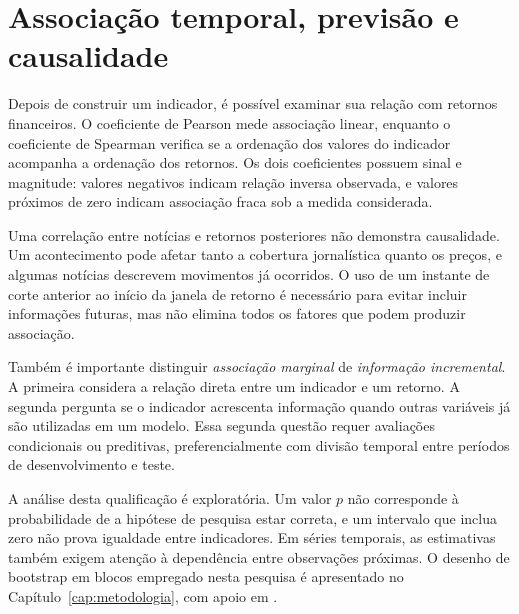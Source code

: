 \section{Associação temporal, previsão e causalidade}

Depois de construir um indicador, é possível examinar sua relação com retornos financeiros. O coeficiente de Pearson mede associação linear, enquanto o coeficiente de Spearman verifica se a ordenação dos valores do indicador acompanha a ordenação dos retornos. Os dois coeficientes possuem sinal e magnitude: valores negativos indicam relação inversa observada, e valores próximos de zero indicam associação fraca sob a medida considerada.

Uma correlação entre notícias e retornos posteriores não demonstra causalidade. Um acontecimento pode afetar tanto a cobertura jornalística quanto os preços, e algumas notícias descrevem movimentos já ocorridos. O uso de um instante de corte anterior ao início da janela de retorno é necessário para evitar incluir informações futuras, mas não elimina todos os fatores que podem produzir associação.

Também é importante distinguir \emph{associação marginal} de \emph{informação incremental}. A primeira considera a relação direta entre um indicador e um retorno. A segunda pergunta se o indicador acrescenta informação quando outras variáveis já são utilizadas em um modelo. Essa segunda questão requer avaliações condicionais ou preditivas, preferencialmente com divisão temporal entre períodos de desenvolvimento e teste.

A análise desta qualificação é exploratória. Um valor $p$ não corresponde à probabilidade de a hipótese de pesquisa estar correta, e um intervalo que inclua zero não prova igualdade entre indicadores. Em séries temporais, as estimativas também exigem atenção à dependência entre observações próximas. O desenho de bootstrap em blocos empregado nesta pesquisa é apresentado no Capítulo~\ref{cap:metodologia}, com apoio em .
